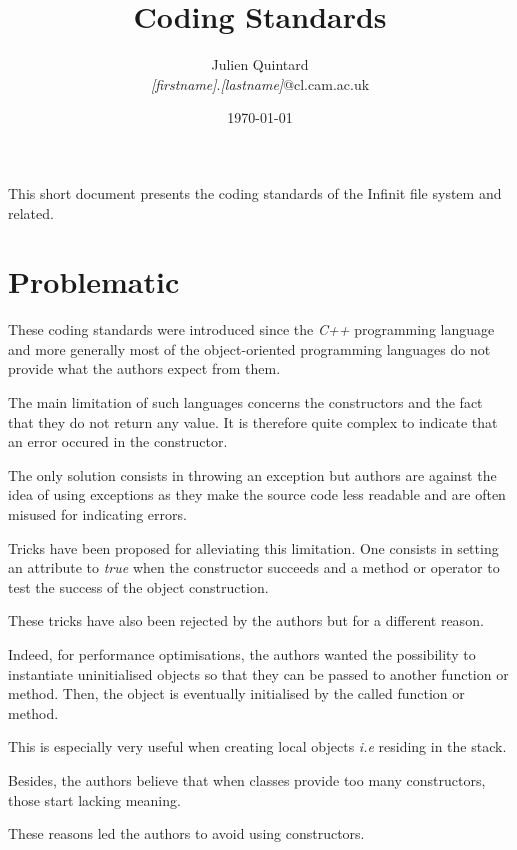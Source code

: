\documentclass[10pt,a4wide]{article}
\title
{
  Coding Standards
  \vspace{2cm}
}
\author
{
  \small{Julien Quintard} \\
  \scriptsize{\textit{[firstname]}.\textit{[lastname]}@cl.cam.ac.uk}
  \vspace{1cm}
}
\date{\scriptsize{\today}}
\newcommand\ie[0]{\textit{i.e}}
\begin{document}
\maketitle

\thispagestyle{empty}

%
%

This short document presents the coding standards of the Infinit file system
and related.

\section{Problematic}

These coding standards were introduced since the \textit{C++} programming
language and more generally most of the object-oriented programming languages
do not provide what the authors expect from them.

The main limitation of such languages concerns the constructors and the fact
that they do not return any value. It is therefore quite complex to indicate
that an error occured in the constructor.

The only solution consists in throwing an exception but authors are against
the idea of using exceptions as they make the source code less readable
and are often misused for indicating errors.

Tricks have been proposed for alleviating this limitation. One consists in
setting an attribute to \textit{true} when the constructor succeeds and
a method or operator to test the success of the object construction.

These tricks have also been rejected by the authors but for a different reason.

Indeed, for performance optimisations, the authors wanted the possibility
to instantiate uninitialised objects so that they can be passed to another
function or method. Then, the object is eventually initialised by the called
function or method.

This is especially very useful when creating local objects \ie{} residing
in the stack.

Besides, the authors believe that when classes provide too many constructors,
those start lacking meaning.

These reasons led the authors to avoid using constructors.

%
%
\end{document}
